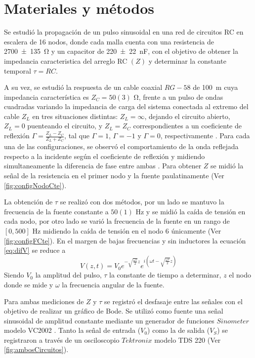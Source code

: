 \section{Materiales y métodos}
Se estudió la propagación de un pulso sinusoidal en una red de circuitos RC en escalera de 16 nodos, donde cada malla cuenta con una resistencia de \SI{2700(135)}{\ohm} y un capacitor de \SI{220(22)}{\nano\farad}, con el objetivo de obtener la impedancia caracteristica del arreglo RC \((Z)\) y determinar la constante temporal \(\tau=RC\). 

A su vez, se estudió la respuesta de un cable coaxial \(RG-58\) de \SI{100}{m} cuya impedancia característica es $Z_C=50(3)$ \si{\ohm}, frente a un pulso de ondas cuadradas variando la impedancia de carga del sistema conectada al extremo del cable \(Z_L\) en tres situaciones distintas: \(Z_L = \infty\), dejando el circuito abierto,  \(Z_L = 0\) puenteando el circuito, y \(Z_L = Z_C\) correspondientes a un coeficiente de reflexión \( \Gamma = \frac{Z_L - Z_C}{Z_L+Z_C} \), tal que \(\Gamma =1\), \(\Gamma=-1\) y \(\Gamma=0\), respectivamente \cite{RG58Cable}. Para cada una de las configuraciones, se observó el comportamiento de la onda reflejada respecto a la incidente según el coeficiente de reflexión y midiendo simultaneamente la diferencia de fase entre ambas \cite{Bobowski_2021}. Para obtener \(Z\) se midió la señal de la resistencia en el primer nodo y la fuente paulatinamente (Ver \autoref{fig:configNodoCte}).

La obtención de \(\tau\) se realizó con dos métodos, por un lado se mantuvo la frecuencia de la fuente constante a $50(1)$ \si{\hertz} y se midió la caída de tensión en cada nodo, por otro lado se varió la frecuencia de la fuente en un rango de \([0,500]\) \si{\hertz} midiendo la caída de tensión en el nodo 6 únicamente (Ver \autoref{fig:configFCte}). En el margen de bajas frecuencias y sin inductores la ecuación \eqref{eq:difV} se reduce a
\begin{equation}
    V(z,t) = V_0 e^{-\sqrt{\frac{\omega \tau}{2}}z} e^{i(\omega t - \sqrt{\frac{\omega \tau}{2}}z)}
    \label{eq:voltajePulso}
\end{equation}
Siendo \(V_0\) la amplitud del pulso, $\tau$ la constante de tiempo a determinar, \(z\) el nodo donde se mide y \(\omega\) la frecuencia angular de la fuente.  

Para ambas mediciones de \(Z\) y \(\tau\) se registró el desfasaje entre las señales con el objetivo de realizar un gráfico de Bode. Se utilizó como fuente una señal sinusoidal de amplitud constante mediante un generador de funciones $Sinometer$ modelo VC2002 \cite{VC2002}. Tanto la señal de entrada (\(V_0\)) como la de salida (\(V_S\)) se registraron a través de un osciloscopio $Tektronix$ modelo TDS 220 \cite{TDS200} (Ver \autoref{fig:ambosCircuitos}).


